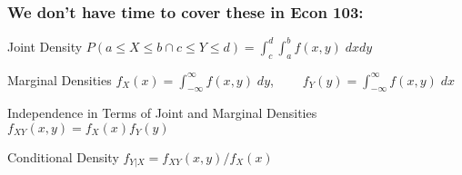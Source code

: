 %
%
%
%
%
%
%
%
\begin{frame}
  \frametitle{We don't have time to cover these in Econ 103:}

\begin{block}{Joint Density}
$ \displaystyle P(a\leq X \leq b \cap c\leq Y \leq d) = \int_c^d \int_a^b f(x,y) \; dxdy$
\end{block}
\begin{block}{Marginal Densities}
$f_X(x) = \int_{-\infty}^\infty f(x,y)\; dy$, $\;\;\;\;\;\;\; f_Y(y) = \int_{-\infty}^\infty f(x,y)\; dx$
\end{block}
\begin{block}{Independence in Terms of Joint and Marginal Densities}
$f_{XY}(x,y) = f_X(x)f_Y(y)$
\end{block}
\begin{block}{Conditional Density}
$f_{Y|X} = f_{XY}(x,y)/f_X(x)$
\end{block}

\end{frame}

